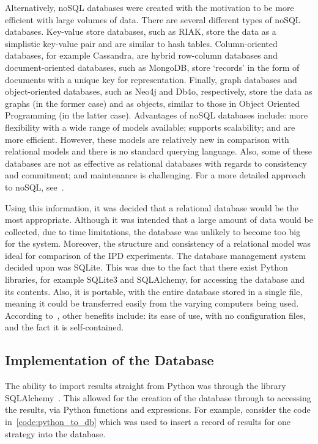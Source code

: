 Alternatively, noSQL databases were created with the motivation to be more
efficient with large volumes of data. There are several different types of noSQL
databases. Key-value store databases, such as RIAK, store the data as a
simplistic key-value pair and are similar to hash tables. Column-oriented
databases, for example Cassandra, are hybrid row-column databases and
document-oriented databases, such as MongoDB, store `records' in the form of
documents with a unique key for representation. Finally, graph databases and
object-oriented databases, such as Neo4j and Db4o, respectively, store the data
as graphs (in the former case) and as objects, similar to those in Object
Oriented Programming (in the latter case). Advantages of noSQL databases
include: more flexibility with a wide range of models available; supports
scalability; and are more efficient. However, these models are relatively new in
comparison with relational models and there is no standard querying language.
Also, some of these databases are not as effective as relational databases
with regards to consistency and commitment; and maintenance is challenging. For a more
detailed approach to noSQL, see~\cite{Nayak2013}.    

Using this information, it was decided that a relational database would be the
most appropriate. Although it was intended that a large amount of data would be
collected, due to time limitations, the database was unlikely
to become too big for the system. Moreover, the structure and consistency of a
relational model was ideal for comparison of the IPD experiments. The database
management system decided upon was SQLite. This was due to the fact that there
exist Python libraries, for example SQLite3 and SQLAlchemy, for accessing the
database and its contents. Also, it is portable, with the entire database stored
in a single file, meaning it could be transferred easily from the varying
computers being used. According to~\cite{ostezer2019}, other benefits include:
its ease of use, with no configuration files, and the fact it is self-contained.


\subsection{Implementation of the Database}
The ability to import results straight from Python was through the library
SQLAlchemy~\cite{sqlalchemy}. This allowed for the creation of the database
through to accessing the results, via Python functions and expressions.  
For example, consider the code in~\autoref{code:python_to_db} which was used to insert a record of
results for one strategy into the database.

